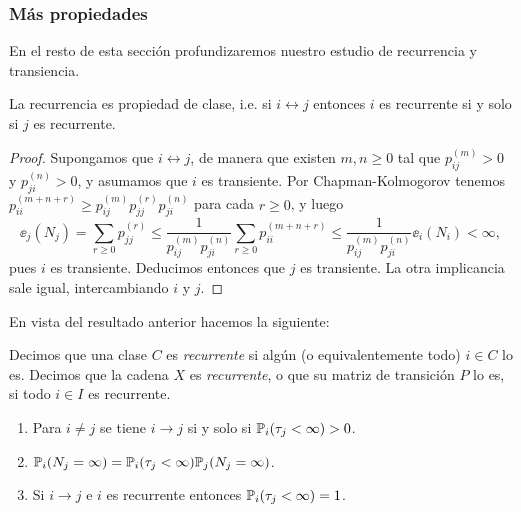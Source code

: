 \subsubsection{Más propiedades}

En el resto de esta sección profundizaremos nuestro estudio de recurrencia y transiencia.

\begin{prop}
La recurrencia es propiedad de clase, i.e. si $i\leftrightarrow j$ entonces $i$ es recurrente si y solo si $j$ es recurrente.
\end{prop}

\begin{proof}
Supongamos que $i\leftrightarrow j$, de manera que existen $m,n\geq0$ tal que $p^{(m)}_{ij}>0$ y $p^{(n)}_{ji}>0$, y asumamos que $i$ es transiente.
Por Chapman-Kolmogorov tenemos $p^{(m+n+r)}_{ii}\geq p^{(m)}_{ij}p^{(r)}_{jj}p^{(n)}_{ji}$ para cada $r\geq0$, y luego
\[\ee_j(N_j)=\sum_{r\geq0}p^{(r)}_{jj}\leq\frac{1}{p^{(m)}_{ij}p^{(n)}_{ji}}\sum_{r\geq0}p^{(m+n+r)}_{ii}\leq\frac{1}{p^{(m)}_{ij}p^{(n)}_{ji}}\ee_i(N_i)<\infty,\]
pues $i$ es transiente.
Deducimos entonces que $j$ es transiente.
La otra implicancia sale igual, intercambiando $i$ y $j$.
\end{proof}

En vista del resultado anterior hacemos la siguiente:

\begin{defn}
Decimos que una clase $C$ es \emph{recurrente} si algún (o equivalentemente todo) $i\in C$ lo es.
Decimos que la cadena $X$ es \emph{recurrente}, o que su matriz de transición $P$ lo es, si todo $i\in I$ es recurrente.
\end{defn}

\begin{prop}\label{prop:recprops}
\leavevmode
\begin{enumerate}[label=\uptext{(\roman*)}]
\item Para $i\neq j$ se tiene $i\rightarrow j$ si y solo si $\mathbb{P}_i(\tau_j<\infty)>0$.
\item $\mathbb{P}_i(N_j=\infty)=\mathbb{P}_i(\tau_j<\infty)\mathbb{P}_j(N_j=\infty)$.
\item Si $i\rightarrow j$ e $i$ es recurrente entonces $\mathbb{P}_i(\tau_j<\infty)=1$.
\end{enumerate}
\end{prop}

